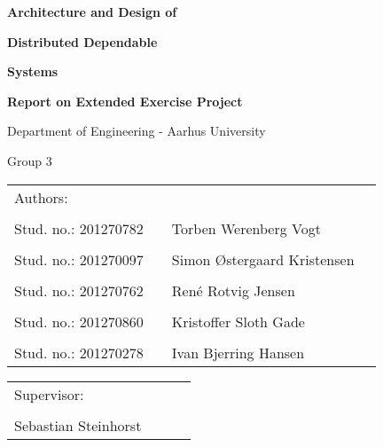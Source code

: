 
\centerline{\Huge\bfseries\color{ThemeColor} Architecture and Design of}
\vspace{0.5em}
\centerline{\Huge\bfseries\color{ThemeColor} Distributed Dependable}
\vspace{0.5em}
\centerline{\Huge\bfseries\color{ThemeColor} Systems}

\vspace{2em}
\centerline{\Large\bfseries\color{BlackColor} Report on Extended Exercise Project}



\vspace{5em}
\centerline{\large\bfseries\color{BlackColor}}
\centerline{\large\color{BlackColor}Department of Engineering - Aarhus University}

\vspace{0.5em}
\centerline{\large\color{BlackColor} Group 3}

\vspace{15em}

\begin{center}
   \begin{tabular}{ l p{3cm} l l }
   Authors: &&& \\
   &&&\\
   Stud. no.: 201270782 && Torben Werenberg Vogt & \\\hline
   &&& \\
   Stud. no.: 201270097 && Simon Østergaard Kristensen & \\\hline
   &&& \\
   Stud. no.: 201270762 && René Rotvig Jensen & \\\hline
   &&& \\
   Stud. no.: 201270860 && Kristoffer Sloth Gade & \\\hline
   &&& \\
   Stud. no.: 201270278 &&  Ivan Bjerring Hansen & \\\hline
   \end{tabular}
\end{center}

\vspace{2em}
\begin{center}
	\begin{tabular}{ l p{8cm} l l }
		Supervisor: &&& \\
		&&&\\
		Sebastian Steinhorst &&& \\\hline
		\end{tabular}
		\end{center}
\thispagestyle{empty} %
\restoregeometry

